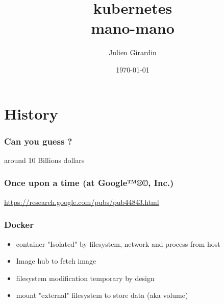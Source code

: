 \documentclass{beamer}
\title{kubernetes \\
       mano-mano}
\author{Julien Girardin}
\date{\today}
\begin{document}
\maketitle{}

\section{History}

\begin{frame}
\frametitle{Can you guess ?}
\centering
\vfill
around 10 Billions dollars
\vfill
{}
\end{frame}

\begin{frame}
  \frametitle{Once upon a time (at Google{\tiny ™®©}, Inc.)}
  \begin{center}
  \href{https://research.google.com/pubs/pub44843.html}
       {https://research.google.com/pubs/pub44843.html}
  \vfill
  \end{center}
\end{frame}

\begin{frame}
  \frametitle{Docker}
  \begin{itemize}
    \item container "Isolated" by filesystem, network and process from host
    \item Image hub to fetch image
    \item filesystem modification temporary by design
    \item mount "external" filesystem to store data (aka volume)
  \end{itemize}
\end{frame}
\end{document}
